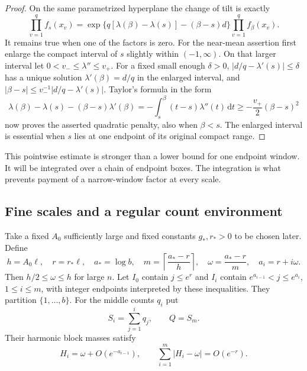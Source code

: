 \documentclass[11pt]{article}
\theoremstyle{definition}\newtheorem{definition}[theorem]{Definition}
\theoremstyle{remark}\newtheorem{remark}[theorem]{Remark}
\newcommand{\dd}{\,\mathrm d}\newcommand{\ind}{\mathbf1}
\numberwithin{equation}{section}\allowdisplaybreaks
\begin{document}
\begin{proof}
On the same parametrized hyperplane the change of tilt is exactly
\[
 \prod_{v=1}^q f_s(x_v)
 =\exp\{q[\lambda(\beta)-\lambda(s)]-(\beta-s)d\}
       \prod_{v=1}^q f_\beta(x_v).
\]
It remains true when one of the factors is zero. For the near-mean
assertion first enlarge the compact interval of $s$ slightly
within $(-1,\infty)$. On that larger interval let
$0<v_-\le\lambda''\le v_+$. For a fixed small enough $\delta>0$,
$|d/q-\lambda'(s)|\le\delta$ has a unique solution
$\lambda'(\beta)=d/q$ in the enlarged interval, and
$|\beta-s|\le v_-^{-1}|d/q-\lambda'(s)|$. Taylor's formula in the
form
\[
 \lambda(\beta)-\lambda(s)-(\beta-s)\lambda'(\beta)
 =-\int_s^\beta(t-s)\lambda''(t)\dd t
 \ge-\frac{v_+}{2}(\beta-s)^2
\]
now proves the asserted quadratic penalty, also when $\beta<s$.
The enlarged interval is essential when $s$ lies at one endpoint
of its original compact range.

\end{proof}

This pointwise estimate is stronger than a lower bound for one endpoint
window. It will be integrated over a chain of endpoint boxes. The
integration is what prevents payment of a narrow-window factor at every
scale.

\subsection{Fine scales and a regular count environment}
Take a fixed $A_0$ sufficiently large and fixed constants $g_*,r_*>0$
to be chosen later. Define
\begin{equation}\label{eq:fine-scales}
 h=A_0\ell,\quad r=r_*\ell,\quad a_*=\log b,\quad
 m=\left\lceil\frac{a_*-r}{h}\right\rceil,\quad
 \omega=\frac{a_*-r}{m},\quad a_i=r+i\omega.
\end{equation}
Then $h/2\le\omega\le h$ for large $n$. Let $I_0$ contain $j\le e^r$
and $I_i$ contain $e^{a_{i-1}}<j\le e^{a_i}$, $1\le i\le m$,
with integer endpoints interpreted by these inequalities. They partition
$\{1,\ldots,b\}$. For the middle counts $q_i$ put
\[
 S_i=\sum_{j=1}^i q_j,\qquad Q=S_m.
\]
Their harmonic block masses satisfy
\begin{equation}\label{eq:harmonic-widths}
 H_i=\omega+O(e^{-a_{i-1}}),\qquad
 \sum_{i=1}^m|H_i-\omega|=O(e^{-r}).
\end{equation}
\end{document}

